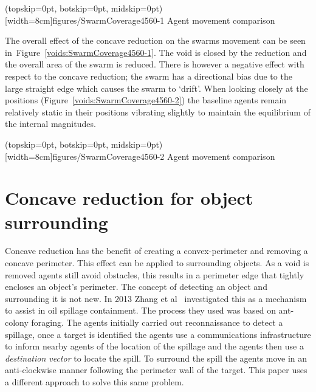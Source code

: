 \documentclass{ieeeaccess}
\begin{document}
\Figure[t!](topskip=0pt, botskip=0pt, midskip=0pt)[width=8cm]{figures/SwarmCoverage4560-1}
{Agent movement comparison\label{voids:SwarmCoverage4560-1}}


The overall effect of the concave reduction on the swarms movement can be seen in~Figure~\ref{voids:SwarmCoverage4560-1}. The void is closed by the reduction and the overall area of the swarm is reduced. There is however a negative effect with respect to the concave reduction; the swarm has a directional bias due to the large straight edge which causes the swarm to `drift'. When looking closely at the positions (Figure~\ref{voids:SwarmCoverage4560-2}) the baseline agents remain relatively static in their positions vibrating slightly to maintain the equilibrium of the internal magnitudes. 

\Figure[t!](topskip=0pt, botskip=0pt, midskip=0pt)[width=8cm]{figures/SwarmCoverage4560-2}
{Agent movement comparison\label{voids:SwarmCoverage4560-2}}


\section{Concave reduction for object surrounding}\label{voids:ObjectSurrounding}
Concave reduction has the benefit of creating a convex-perimeter and removing a concave perimeter. This effect can be applied to surrounding objects. As a void is removed agents still avoid obstacles, this results in a perimeter edge that tightly encloses an object's perimeter. The concept of detecting an object and surrounding it is not new. In 2013 Zhang et al~\cite{ZFG:13} investigated this as a mechanism to assist in oil spillage containment. The process they used was based on ant-colony foraging. The agents initially carried out reconnaissance to detect a spillage, once a target is identified the agents use a communications infrastructure to inform nearby agents of the location of the spillage and the agents then use a \textit{destination vector} to locate the spill. To surround the spill the agents move in an anti-clockwise manner following the perimeter wall of the target. This paper uses a different approach to solve this same problem.
\end{document}

